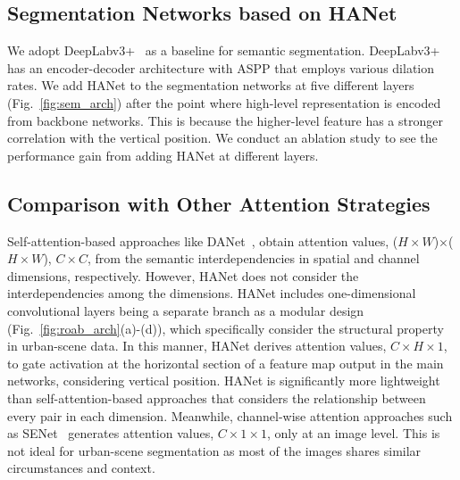 \documentclass[10pt,twocolumn,letterpaper]{article}
\begin{document}
\vspace*{-0.1cm}
\subsection{Segmentation Networks based on HANet}
\vspace*{-0.1cm}
We adopt DeepLabv3+~\cite{chen2018deeplab} as a baseline for semantic segmentation. DeepLabv3+ has an encoder-decoder architecture with ASPP that employs various dilation rates. We add HANet to the segmentation networks at five different layers (Fig.~\ref{fig:sem_arch}) after the point where high-level representation is encoded from backbone networks. 
This is because the higher-level feature has 
a stronger correlation with 
the vertical position. We conduct 
an ablation study to see the performance gain from adding HANet at different layers.
\vspace*{-0.1cm}
\subsection{Comparison with Other Attention Strategies}
\vspace*{-0.1cm}
Self-attention-based approaches like DANet~\cite{fu2019dual}, obtain attention values, ($H\times W$)$\times$($H\times W$), $C\times C$, from the semantic interdependencies in spatial and channel dimensions, respectively.
However, HANet does not consider the interdependencies among the dimensions. HANet includes one-dimensional convolutional layers being a separate branch as a modular design (Fig.~\ref{fig:roab_arch}(a)-(d)),
which specifically consider the structural property in urban-scene data. In this manner, HANet derives attention values, $C\times H\times 1$, to gate activation at the horizontal section of a feature map output in the main networks, considering vertical position. 
HANet is significantly more lightweight than self-attention-based approaches that considers the relationship between every pair in each dimension.
Meanwhile, channel-wise attention approaches such as SENet~\cite{hu2018squeeze} generates attention values, $C\times 1\times 1$, only at an image level. This is not ideal for urban-scene segmentation as most of the images shares similar circumstances and context.
\end{document}
